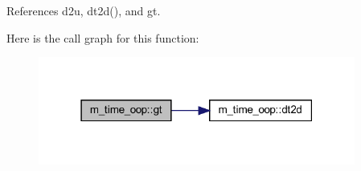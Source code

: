 References d2u, dt2d(), and gt.

Here is the call graph for this function\+:
\nopagebreak
\begin{figure}[H]
\begin{center}
\leavevmode
\includegraphics[width=295pt]{namespacem__time__oop_a753692f18b6cd100401603d0b88d7c3c_cgraph}
\end{center}
\end{figure}
\mbox{\label{namespacem__time__oop_ac81ff1eb27f637a60530d3c5d442fc71}} 
